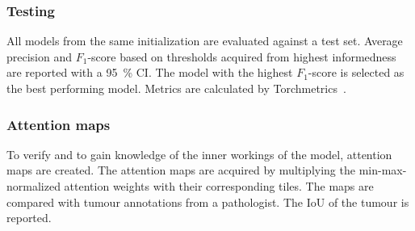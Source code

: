 \subsubsection{Testing}
All models from the same initialization are evaluated against a test set.
Average precision and $F_1$-score based on thresholds acquired from highest informedness are reported with a \qty{95}{\percent} CI.
The model with the highest $F_1$-score is selected as the best performing model.
Metrics are calculated by Torchmetrics~\cite{Detlefsen2022}.

\subsubsection{Attention maps}
To verify and to gain knowledge of the inner workings of the model, attention maps are created.
The attention maps are acquired by multiplying the min-max-normalized attention weights with their corresponding tiles.
The maps are compared with tumour annotations from a pathologist.
The IoU of the tumour is reported.
